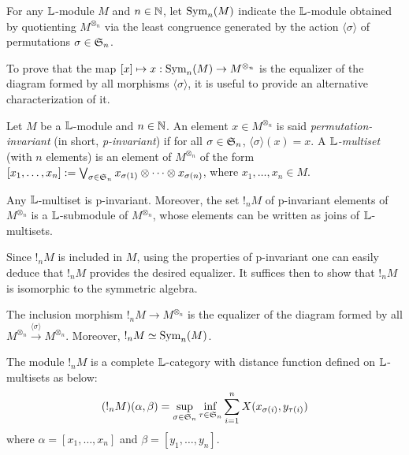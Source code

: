 \begin{definition}

For any $\mathbb{L}$-module $M$ and $n\in \mathbb{N}$, let $\mathrm{Sym}_{n}(M)$ indicate the $\mathbb{L}$-module obtained by quotienting 
$M^{\otimes_{n}}$ via the least congruence generated by the action $\langle \sigma \rangle$ of permutations $\sigma\in \mathfrak{S}_{n}$.
\end{definition}


To prove that the map $[x]\mapsto x:\mathrm{Sym}_{n}(M)\to M^{\otimes_{n}} $ is the equalizer of the diagram formed by all morphisms $\langle \sigma\rangle$, it is useful to provide an alternative characterization of it. 

\begin{definition}
Let $M$ be a $\mathbb{L}$-module and $n\in \mathbb{N}$. An element $x\in M^{\otimes_{n}}$ is said \emph{permutation-invariant} (in short, \emph{p-invariant}) if for all $\sigma\in \mathfrak{S}_{n}$, 
$\langle \sigma \rangle (x)=x$. 
 A \emph{$\mathbb{L}$-multiset} (with $n$ elements) is an element of $M^{\otimes_{n}}$ of the form 
$ [x_{1},\dots, x_{n}]:= \bigvee_{\sigma\in \mathfrak{S}_{n}}
 x_{\sigma(1)}\otimes \dots \otimes x_{\sigma(n)}$, where $x_{1},\dots, x_{n}\in M$.
\end{definition} 

\begin{proposition}
Any $\mathbb{L}$-multiset is p-invariant. Moreover, the set $!_{n}M$ of p-invariant elements of $M^{\otimes_{n}}$ is a $\mathbb{L}$-submodule of $M^{\otimes_{n}}$, whose elements can be written as joins of $\mathbb{L}$-multisets.
\end{proposition}

Since $!_{n}M$ is included in $M$, using the properties of p-invariant one can easily deduce that $!_{n}M$ provides the desired equalizer. It suffices then to show that $!_{n}M$ is isomorphic to the symmetric algebra.


\begin{proposition}
The inclusion morphism $!_{n}M \to M^{\otimes_{n}}$ is the equalizer of the diagram formed by all $M^{\otimes_{n}}\stackrel{\langle \sigma\rangle}{\to} M^{\otimes_{n}}$. Moreover, 
$!_{n}M \simeq \mathrm{Sym}_{n}(M)$.
\end{proposition}


The module $!_{n}M$ is a complete $\mathbb{L}$-category with distance function defined on $\mathbb{L}$-multisets as below:
\begin{align}
(!_{n}M)(\alpha,\beta)=
\sup_{\sigma\in \mathfrak{S}_{n}}\inf_{\tau\in \mathfrak{S}_{n}}\sum_{i=1}^{n}
X(x_{\sigma(i)},y_{\tau(i)})
\end{align}
where $\alpha=[x_{1},\dots, x_{n}]$ and $\beta= [y_{1},\dots, y_{n}]$.




